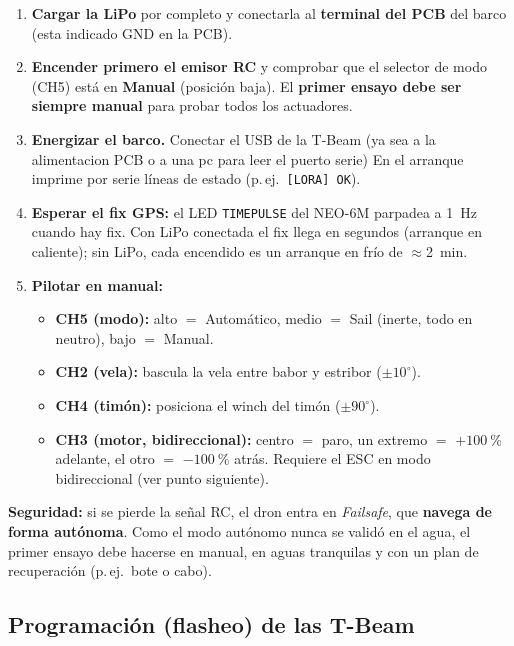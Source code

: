 \documentclass[12pt,a4paper]{article}
\begin{document}
\begin{enumerate}
  \item \textbf{Cargar la LiPo} por completo y conectarla al \textbf{terminal del PCB} del barco (esta indicado GND en la PCB).
  \item \textbf{Encender primero el emisor RC} y comprobar que el selector de modo
    (CH5) est\'a en \textbf{Manual} (posici\'on baja). El \textbf{primer ensayo debe
    ser siempre manual} para probar todos los actuadores.
  \item \textbf{Energizar el barco.} Conectar el USB de la T-Beam (ya sea a la alimentacion PCB o a una pc para leer el puerto serie) En el arranque imprime por serie l\'ineas de
    estado (p.\,ej.\ \texttt{[LORA] OK}).
  \item \textbf{Esperar el fix GPS:} el LED \texttt{TIMEPULSE} del NEO-6M parpadea a
    1~Hz cuando hay fix. Con LiPo conectada el fix llega en segundos (arranque en
    caliente); sin LiPo, cada encendido es un arranque en fr\'io de $\approx$2~min.
  \item \textbf{Pilotar en manual:}
  \begin{itemize}
    \item \textbf{CH5 (modo):} alto $=$ Autom\'atico, medio $=$ Sail (inerte, todo en
      neutro), bajo $=$ Manual.
    \item \textbf{CH2 (vela):} bascula la vela entre babor y estribor ($\pm10^{\circ}$).
    \item \textbf{CH4 (tim\'on):} posiciona el winch del tim\'on ($\pm90^{\circ}$).
    \item \textbf{CH3 (motor, bidireccional):} centro $=$ paro, un extremo $=$
      $+100~\%$ adelante, el otro $=$ $-100~\%$ atr\'as. Requiere el ESC en modo
      bidireccional (ver punto siguiente).
  \end{itemize}
\end{enumerate}

\begin{warningbox}
  \textbf{Seguridad:} si se pierde la se\~nal RC, el dron entra en \emph{Failsafe},
  que \textbf{navega de forma aut\'onoma}. Como el modo aut\'onomo nunca se valid\'o
  en el agua, el primer ensayo debe hacerse en manual, en aguas tranquilas y con un
  plan de recuperaci\'on (p.\,ej.\ bote o cabo).
\end{warningbox}

\subsection{Programaci\'on (flasheo) de las T-Beam}
\end{document}

